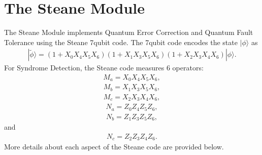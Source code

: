 \documentclass[letterpaper,10pt,english]{sphinxmanual}
\begin{document}
\section{The Steane Module}
\label{\detokenize{Steane:the-steane-module}}\label{\detokenize{Steane::doc}}\label{\detokenize{Steane:module-Steane}}
The Steane Module implements Quantum Error Correction and Quantum Fault Tolerance using the Steane 7\sphinxhyphen{}qubit code. 
The 7\sphinxhyphen{}qubit code encodes the state \(|\phi\rangle\) as 
\begin{equation*}
\begin{split}|\tilde{\phi}\rangle = (1+X_0X_4X_5X_6)(1+X_1X_3X_5X_6)(1+X_2X_3X_4X_6)|\phi\rangle.\end{split}
\end{equation*}
For Syndrome Detection, the Steane code measures 6 operators:
\begin{equation*}
\begin{split}M_a = X_0X_4X_5X_6,\end{split}
\end{equation*}
\begin{equation*}
\begin{split}M_b = X_1X_3X_5X_6,\end{split}
\end{equation*}
\begin{equation*}
\begin{split}M_c = X_2X_3X_4X_6,\end{split}
\end{equation*}
\begin{equation*}
\begin{split}N_a = Z_0Z_4Z_5Z_6,\end{split}
\end{equation*}
\begin{equation*}
\begin{split}N_b = Z_1Z_3Z_5Z_6,\end{split}
\end{equation*}
and
\begin{equation*}
\begin{split}N_c = Z_2Z_3Z_4Z_6.\end{split}
\end{equation*}
More details about each aspect of the Steane code are provided below.
\end{document}
